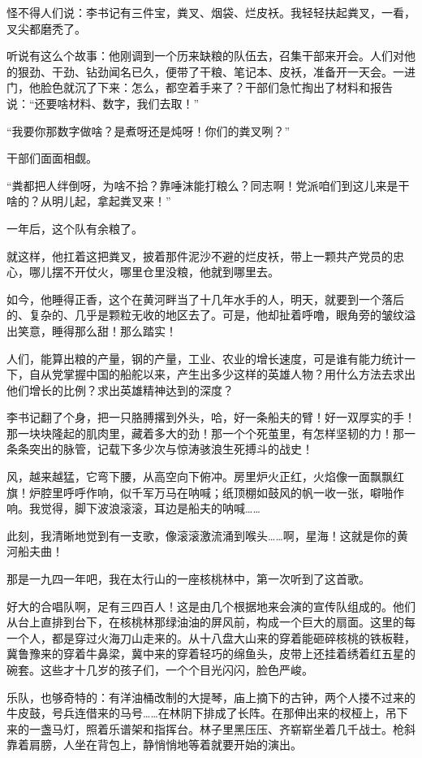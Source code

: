 \documentclass[12pt,UTF-8,openany]{ctexbook}
\begin{document}
\begin{normalsize}
    怪不得人们说：李书记有三件宝，粪叉、烟袋、烂皮袄。我轻轻扶起粪叉，一看，叉尖都磨秃了。
    
    听说有这么个故事：他刚调到一个历来缺粮的队伍去，召集干部来开会。人们对他的狠劲、干劲、钻劲闻名已久，便带了干粮、笔记本、皮袄，准备开一天会。一进门，他脸色就沉了下来：怎么，都空着手来了？干部们急忙掏出了材料和报告说：“还要啥材料、数字，我们去取！”
    
    “我要你那数字做啥？是煮呀还是炖呀！你们的粪叉咧？”
    
    干部们面面相觑。
    
    “粪都把人绊倒呀，为啥不拾？靠唾沫能打粮么？同志啊！党派咱们到这儿来是干啥的？从明儿起，拿起粪叉来！”
    
    一年后，这个队有余粮了。
    
    就这样，他扛着这把粪叉，披着那件泥沙不避的烂皮袄，带上一颗共产党员的忠心，哪儿摆不开仗火，哪里仓里没粮，他就到哪里去。
    
    如今，他睡得正香，这个在黄河畔当了十几年水手的人，明天，就要到一个落后的、复杂的、几乎是颗粒无收的地区去了。可是，他却扯着呼噜，眼角旁的皱纹溢出笑意，睡得那么甜！那么踏实！
    
    人们，能算出粮的产量，钢的产量，工业、农业的增长速度，可是谁有能力统计一下，自从党掌握中国的船舵以来，产生出多少这样的英雄人物？用什么方法去求出他们增长的比例？求出英雄精神达到的深度？
    
    李书记翻了个身，把一只胳膊撂到外头，哈，好一条船夫的臂！好一双厚实的手！那一块块隆起的肌肉里，藏着多大的劲！那一个个死茧里，有怎样坚韧的力！那一条条突出的脉管，记载下多少次与惊涛骇浪生死搏斗的战史！
    
    风，越来越猛，它弯下腰，从高空向下俯冲。房里炉火正红，火焰像一面飘飘红旗！炉腔里呼呼作响，似千军万马在呐喊；纸顶棚如鼓风的帆一收一张，噼啪作响。我觉得，脚下波浪滚滚，耳边是船夫的呐喊……
    
    此刻，我清晰地觉到有一支歌，像滚滚激流涌到喉头……啊，星海！这就是你的黄河船夫曲！
    
    那是一九四一年吧，我在太行山的一座核桃林中，第一次听到了这首歌。
    
    好大的合唱队啊，足有三四百人！这是由几个根据地来会演的宣传队组成的。他们从台上直排到台下，在核桃林那绿油油的屏风前，构成一个巨大的扇面。这里的每一个人，都是穿过火海刀山走来的。从十八盘大山来的穿着能砸碎核桃的铁板鞋，冀鲁豫来的穿着牛鼻梁，冀中来的穿着轻巧的绵鱼头，皮带上还挂着绣着红五星的碗套。这些才十几岁的孩子们，一个个目光闪闪，脸色严峻。
    
    乐队，也够奇特的：有洋油桶改制的大提琴，庙上摘下的古钟，两个人搂不过来的牛皮鼓，号兵连借来的马号……在林阴下排成了长阵。在那伸出来的杈桠上，吊下来的一盏马灯，照着乐谱架和指挥台。林子里黑压压、齐崭崭坐着几千战士。枪斜靠着肩膀，人坐在背包上，静悄悄地等着就要开始的演出。
    

\end{normalsize}
\end{document}
